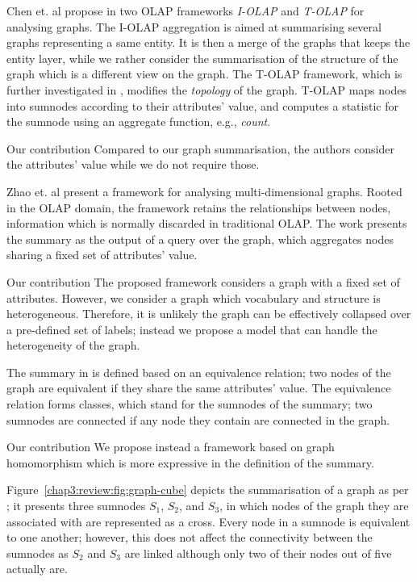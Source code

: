 Chen et. al propose in \cite{chen:icdm:2008} two OLAP frameworks \emph{I-OLAP} and \emph{T-OLAP} for analysing graphs. The I-OLAP aggregation is aimed at summarising several graphs representing a same entity. It is then a merge of the graphs that keeps the entity layer, while we rather consider the summarisation of the structure of the graph which is a different view on the graph. The T-OLAP framework, which is further investigated in \cite{qu:dasfaa:2011}, modifies the \emph{topology} of the graph. T-OLAP maps nodes into sumnodes according to their attributes' value, and computes a statistic for the sumnode using an aggregate function, e.g., \emph{count}.

\begin{centeremph}{Our contribution}
	Compared to our graph summarisation, the authors consider the attributes' value while we do not require those.
\end{centeremph}

Zhao et. al \cite{zhao:sigmod:2011} present a framework for analysing multi-dimensional graphs. Rooted in the OLAP domain, the framework retains the relationships between nodes, information which is normally discarded in traditional OLAP. The work presents the summary as the output of a query over the graph, which aggregates nodes sharing a fixed set of attributes' value.

\begin{centeremph}{Our contribution}
	The proposed framework considers a graph with a fixed set of attributes. However, we consider a graph which vocabulary and structure is heterogeneous. Therefore, it is unlikely the graph can be effectively collapsed over a pre-defined set of labels; instead we propose a model that can handle the heterogeneity of the graph.
\end{centeremph}

The summary in \cite{zhao:sigmod:2011} is defined based on an equivalence relation; two nodes of the graph are equivalent if they share the same attributes' value. The equivalence relation forms classes, which stand for the sumnodes of the summary; two sumnodes are connected if any node they contain are connected in the graph.

\begin{centeremph}{Our contribution}
	We propose instead a framework based on graph homomorphism which is more expressive in the definition of the summary.
\end{centeremph}

Figure~\ref{chap3:review:fig:graph-cube} depicts the summarisation of a graph as per \cite{zhao:sigmod:2011}; it presents three sumnodes $S_1$, $S_2$, and $S_3$, in which nodes of the graph they are associated with are represented as a cross. Every node in a sumnode is equivalent to one another; however, this does not affect the connectivity between the sumnodes as $S_2$ and $S_3$ are linked although only two of their nodes out of five actually are.

